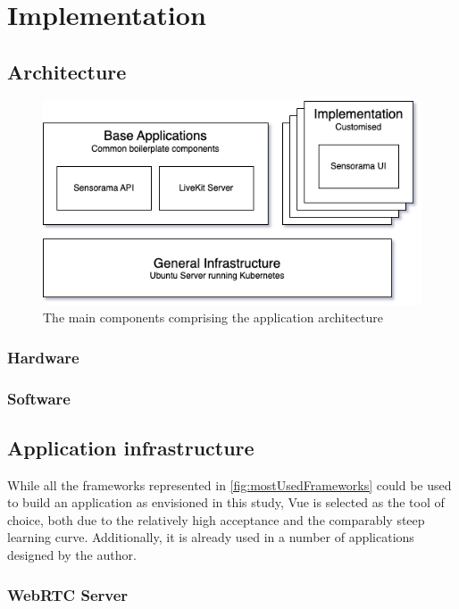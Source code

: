 \chapter{Implementation}

\section{Architecture}

\begin{figure}[h]
\centering
\includegraphics[scale=0.5]{04_Artefakte/01_Abbildungen/sensorama-stack}
\caption[{Sensorama Stack Diagram}]{The main components comprising the application architecture\protect}
\label{fig:sensoramaStack}
\end{figure}

\subsection{Hardware}

\subsection{Software}


\section{Application infrastructure}

While all the frameworks represented in \ref{fig:mostUsedFrameworks} could be used to build an application as envisioned in this study, Vue is selected as the tool of choice, both due to the relatively high acceptance and the comparably steep learning curve. Additionally, it is already used in a number of applications designed by the author.

\subsection{WebRTC Server}

